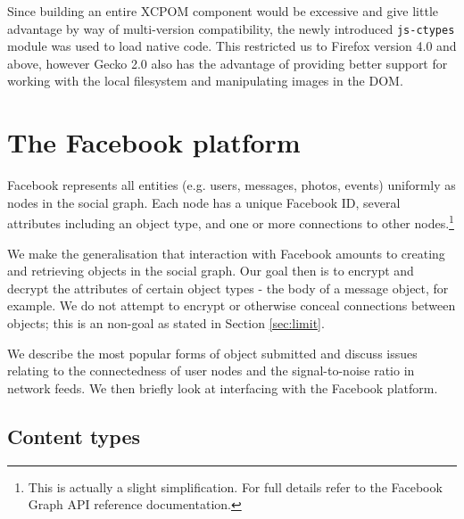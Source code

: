 Since building an entire XCPOM component would be excessive and give little advantage by way of multi-version compatibility, the newly introduced {\tt js-ctypes} module was used to load native code. This restricted us to Firefox version 4.0 and above, however Gecko 2.0 also has the advantage of providing better support for working with the local filesystem and manipulating images in the DOM.


\FloatBarrier
\section{The Facebook platform}
\label{sec:facebook}


Facebook represents all entities (e.g. users, messages, photos, events) uniformly as nodes in the social graph. Each node has a unique Facebook ID, several attributes including an object type, and one or more connections to other nodes.\footnote{This is actually a slight simplification. For full details refer to the Facebook Graph API reference documentation.}

We make the generalisation that interaction with Facebook amounts to creating and retrieving objects in the social graph. Our goal then is to encrypt and decrypt the attributes of certain object types - the body of a message object, for example. We do not attempt to encrypt or otherwise conceal connections between objects; this is an non-goal as stated in Section \ref{sec:limit}.

We describe the most popular forms of object submitted and discuss issues relating to the connectedness of user nodes and the signal-to-noise ratio in network feeds. We then briefly look at interfacing with the Facebook platform.

\FloatBarrier
\subsection{Content types}
\label{sec:content}

